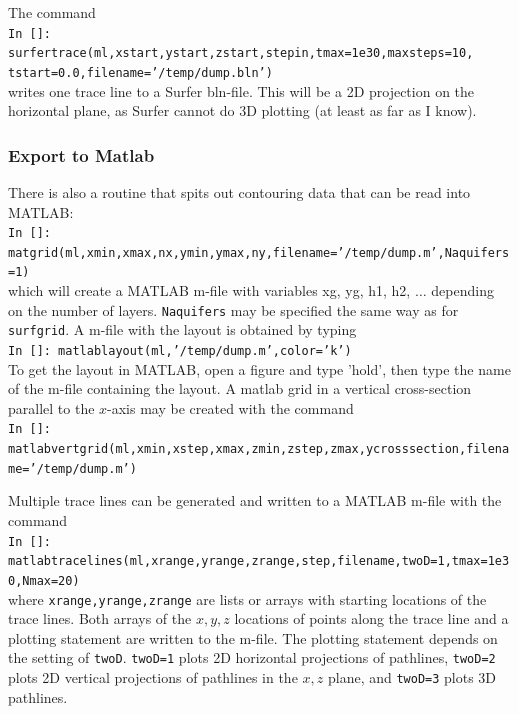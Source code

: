 \documentclass [10pt,letterpaper] {article}
\begin{document}
The command
\\{\tt In []: surfertrace(ml,xstart,ystart,zstart,stepin,tmax=1e30,maxsteps=10,}
\\{\tt tstart=0.0,filename='/temp/dump.bln')}
\\writes one trace line to a Surfer bln-file. This will be a 2D projection on the horizontal plane,
as Surfer cannot do 3D plotting (at least as far as I know).

\subsubsection{Export to Matlab}
There is also a routine that spits out contouring data that can
be read into MATLAB:
\\ {\tt In []:
matgrid(ml,xmin,xmax,nx,ymin,ymax,ny,filename='/temp/dump.m',Naquifers=1)}
\\ which will create a MATLAB m-file with variables xg, yg, h1,
h2, $\hdots$ depending on the number of layers. {\tt Naquifers} may be
specified the same way as for {\tt surfgrid}. A m-file with the layout is
obtained by typing
\\ {\tt In []: matlablayout(ml,'/temp/dump.m',color='k')}
\\To get the layout in MATLAB, open a figure and type 'hold', then type the name of the m-file containing
the layout.
A matlab grid in a vertical cross-section parallel to the $x$-axis may be created with the command
\\ {\tt In []: matlabvertgrid(ml,xmin,xstep,xmax,zmin,zstep,zmax,ycrosssection,filename='/temp/dump.m')}

Multiple
trace lines can be generated and written to a MATLAB m-file with the command
\\{\tt In []: matlabtracelines(ml,xrange,yrange,zrange,step,filename,twoD=1,tmax=1e30,Nmax=20)}
\\ where {\tt xrange,yrange,zrange} are lists or arrays with starting
locations of the trace lines. Both arrays of the $x,y,z$ locations of points
along the trace line and a plotting statement are written to the m-file. The plotting statement
depends on the setting of {\tt twoD}. {\tt twoD=1} plots 2D horizontal projections of pathlines,
{\tt twoD=2} plots 2D vertical projections of pathlines in the $x,z$ plane, and {\tt twoD=3} plots
3D pathlines.
\end{document}
